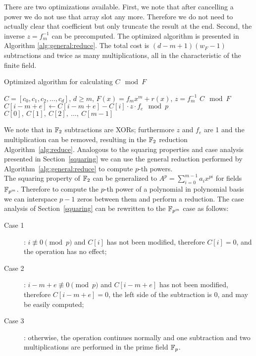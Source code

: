 There are two optimizations available. First, we note that after cancelling a power we do not use that array slot any more. Therefore we do not need to actually clear that coefficient but only truncate the result at the end. Second, the inverse $z = f_m^{-1}$ can be precomputed. The optimized algorithm is presented in Algorithm \ref{alg:general:reduce}. The total cost is $(d-m+1) (w_F-1)$ subtractions and twice as many multiplications, all in the characteristic of the finite field.

\begin{algorithm}
\caption{Optimized algorithm for calculating $C \mod F$}
\label{alg:general:reduce}
\begin{algorithmic}[1]
    \REQUIRE $C = [c_0, c_1, c_2, ..., c_d]$, $d \geq m$, $F(x) = f_m x^m + r(x)$, $z = f_m^{-1}$
    \ENSURE $C \mod F$
            \STATE $C[i-m+e] \leftarrow C[i-m+e] - C[i] \cdot z \cdot f_e \mod p$
        \ENDFOR
    \ENDFOR
    \RETURN $C[0],~C[1],~C[2],~\ldots,~C[m-1]$
\end{algorithmic}
\end{algorithm}

We note that in $\mathbb{F}_2$ subtractions are XORs; furthermore $z$ and $f_e$ are 1 and the multiplication can be removed, resulting in the $\mathbb{F}_2$ reduction Algorithm~\ref{alg:reduce}. Analogous to the squaring properties and case analysis presented in Section~\ref{squaring} we can use the general reduction performed by Algorithm~\ref{alg:general:reduce} to compute $p$-th powers. \\

The squaring property of $\mathbb{F}_2$ can be generalized to $A^p = \sum_{i=0}^{m-1} a_i x^{pi}$ for fields $\mathbb{F}_{p^m}$. Therefore to compute the $p$-th power of a polynomial in polynomial basis we can interspace $p-1$ zeros between them and perform a reduction. The case analysis of Section~\ref{squaring} can be rewritten to the $\mathbb{F}_{p^m}$ case as follows:

\begin{description}
\item[Case 1]: $i \not\equiv 0 \pmod{p}$ and $C[i]$ has not been modified, therefore $C[i] = 0$, and the operation has no effect;
\item[Case 2]: $i-m+e \not\equiv 0 \pmod{p}$ and $C[i-m+e]$ has not been modified, therefore $C[i-m+e] = 0$, the left side of the subtraction is $0$, and may be easily computed;
\item[Case 3]: otherwise, the operation continues normally and one subtraction and two multiplications are performed in the prime field $\mathbb{F}_p$.
\end{description}
    
